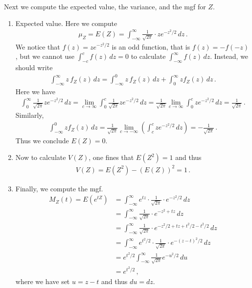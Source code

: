 \documentclass[11pt,oneside]{book}
\theoremstyle{newStyle}
\begin{document}
Next we compute the expected value, the variance, and the mgf for $Z$. 
\begin{enumerate}
\item Expected value. Here we compute
\begin{align*}
\mu_Z = E(Z) = \int_{-\infty}^\infty \frac{1}{\sqrt{2\pi}}\cdot ze^{-z^2/2}\, dz\,.
\end{align*}
We notice that $f(z) = ze^{-z^2/2}$ is an odd function, that is $f(z) = -f(-z)$, but we cannot use 
$\int_{-c}^c f(z) \, dz = 0
$ to calculate $
\int_{-\infty}^\infty f(z)\, dz$. Instead, we should write
\begin{align*}
\int_{-\infty}^\infty z \, f_Z(z) \, dz = \int_{-\infty}^0 z\, f_Z(z) \, dz + \int_{0}^\infty zf_Z(z)\, dz\,.
\end{align*}
Here we have
\begin{align*}
\int_0^{\infty} \frac{1}{\sqrt{
2\pi}}ze^{-z^2/2}\, dz = \lim_{c\to \infty}\int_0^c \frac{1}{\sqrt{2\pi}} ze^{-z^2/2}\, dz = \frac{1}{\sqrt{2\pi}}\lim_{c\to \infty}\int_0^c ze^{-z^2/2}\, dz = \frac{1}{\sqrt{
2\pi}}\,.
\end{align*}
Similarly, 
\begin{align*}
\int_{-\infty}^0 zf_Z(z)\, dz = \frac{1}{\sqrt{2\pi}}\lim_{c\to -\infty}\left( \int_{c}^c ze^{-z^2/2}\,dz\right) = -\frac{1}{\sqrt{2\pi}}\,.
\end{align*}
Thus we conclude $E(Z) = 0$. 
\item Now to calculate $V(Z)$, one fines that $E(Z^2) = 1$ and thus
\begin{align*}
V(Z) = E(Z^2) - (E(Z))^2 = 1\,.
\end{align*}
\item Finally, we compute the mgf. 
\begin{align*}
M_Z(t) = E(e^{tZ}) 
&= \int_{-\infty}^\infty e^{tz} \cdot \frac{1}{\sqrt{2\pi}}\cdot e^{-z^2/2}\, dz\\
&= \int_{-\infty}^\infty \frac{1}{\sqrt{2\pi}}\cdot e^{-z^2+tz}\, dz \\
&= \int_{-\infty}^\infty \frac{1}{\sqrt{2\pi}}\cdot e^{-z^2/2 + tz+ t^2/2 - t^2/2}\, dz\\
&= \int_{-\infty}^\infty e^{t^2/2}\cdot \frac{1}{\sqrt{2\pi}} \cdot e^{-(z-t)^2/2}\, dz\\
&= e^{t^2/2}\int_{-\infty}^\infty \frac{1}{\sqrt{2\pi}}e^{-u^2/2}\, du \\
&= e^{t^2/2}\,,
\end{align*}
where we have set $u = z-t$ and thus $du=dz$. \\
\end{enumerate}
\end{document}
